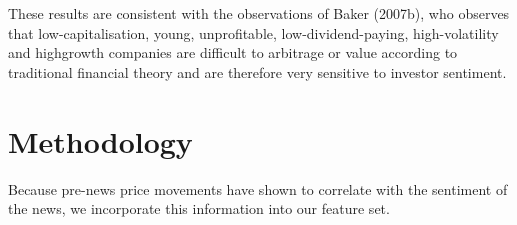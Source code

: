 \documentclass[12pt,a4paper]{article}
\begin{document}
	\bigskip
	These results are consistent with the observations of Baker (2007b), who observes that low-capitalisation, young, unprofitable, low-dividend-paying, high-volatility and highgrowth companies are difficult to arbitrage or value according to traditional financial theory and are therefore very sensitive to investor sentiment.
	
	
	\section{Methodology}
	Because pre-news price movements have shown to correlate with the sentiment of the news, we incorporate this information
	into our feature set.
	
	
	
	
	
\end{document}

